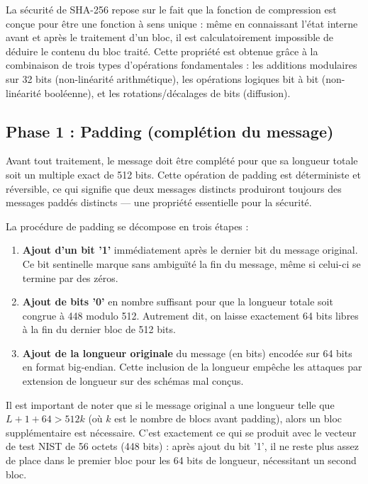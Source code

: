 La sécurité de SHA-256 repose sur le fait que la fonction de compression est conçue pour être une fonction à sens unique : même en connaissant l'état interne avant et après le traitement d'un bloc, il est calculatoirement impossible de déduire le contenu du bloc traité. Cette propriété est obtenue grâce à la combinaison de trois types d'opérations fondamentales : les additions modulaires sur 32 bits (non-linéarité arithmétique), les opérations logiques bit à bit (non-linéarité booléenne), et les rotations/décalages de bits (diffusion).

\subsection{Phase 1 : Padding (complétion du message)}

Avant tout traitement, le message doit être complété pour que sa longueur totale soit un multiple exact de 512 bits. Cette opération de padding est déterministe et réversible, ce qui signifie que deux messages distincts produiront toujours des messages paddés distincts --- une propriété essentielle pour la sécurité.

La procédure de padding se décompose en trois étapes :

\begin{enumerate}
    \item \textbf{Ajout d'un bit '1'} immédiatement après le dernier bit du message original. Ce bit sentinelle marque sans ambiguïté la fin du message, même si celui-ci se termine par des zéros.
    \item \textbf{Ajout de bits '0'} en nombre suffisant pour que la longueur totale soit congrue à 448 modulo 512. Autrement dit, on laisse exactement 64 bits libres à la fin du dernier bloc de 512 bits.
    \item \textbf{Ajout de la longueur originale} du message (en bits) encodée sur 64 bits en format big-endian. Cette inclusion de la longueur empêche les attaques par extension de longueur sur des schémas mal conçus.
\end{enumerate}

Il est important de noter que si le message original a une longueur telle que $L + 1 + 64 > 512k$ (où $k$ est le nombre de blocs avant padding), alors un bloc supplémentaire est nécessaire. C'est exactement ce qui se produit avec le vecteur de test NIST de 56 octets (448 bits) : après ajout du bit '1', il ne reste plus assez de place dans le premier bloc pour les 64 bits de longueur, nécessitant un second bloc.

